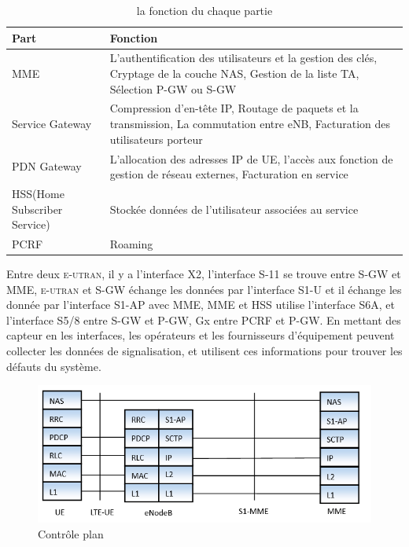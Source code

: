 \begin{table}[H]
	\begin{tabular}{|>{\centering\arraybackslash}p{2cm}|>{\centering\arraybackslash}p{11 cm}|}
		\hline Part &                     Fonction\\
		\hline MME & 
			L'authentification des utilisateurs et la gestion des clés,  Cryptage de la couche NAS,  Gestion de la liste TA, Sélection P-GW ou S-GW \\ 
		\hline Service Gateway & Compression d'en-tête IP, Routage de paquets et la transmission, La commutation entre eNB, Facturation des utilisateurs porteur \\ 
		\hline PDN Gateway & L'allocation des adresses IP de UE, l'accès aux fonction de gestion de réseau externes, Facturation en service \\ 
		\hline HSS(Home Subscriber Service) & Stockée données de l'utilisateur associées au service \\ 
		\hline PCRF & Roaming \\ 
		\hline 
	\end{tabular} 
	\caption{la fonction du chaque partie}
	\label{founction du chaque partie}
\end{table}    

Entre deux \textsc{e-utran}, il y a l'interface X2, l'interface S-11 se trouve entre S-GW et MME, \textsc{e-utran} et S-GW échange les données par l'interface S1-U et il échange les donnée par l'interface S1-AP avec MME, MME et HSS utilise l'interface S6A, et l'interface S5/8 entre S-GW et P-GW, Gx entre PCRF et P-GW. En mettant des capteur en les interfaces, les opérateurs et les fournisseurs d'équipement peuvent collecter les données de signalisation, et utilisent ces informations pour trouver les défauts du système. 

\begin{figure}[H]
\centering
\includegraphics[width=0.9\linewidth]{images/s1-mme}
\caption{Contrôle plan}
\label{fig:s1-mme}
\end{figure}

